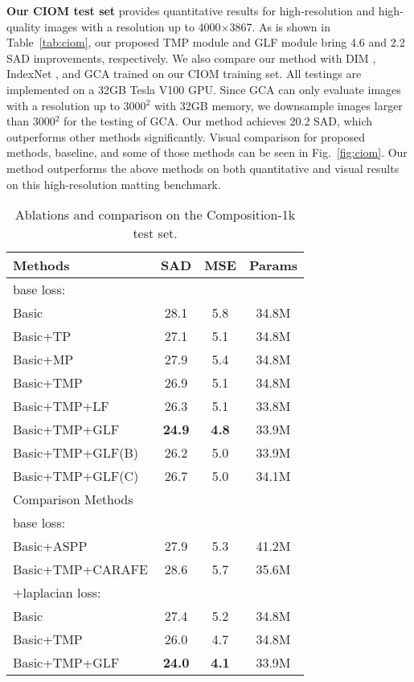 \documentclass[10pt,twocolumn,letterpaper]{article}
\begin{document}
\textbf{Our CIOM test set} provides quantitative results for high-resolution and high-quality images with a resolution up to 4000$\times$3867. As is shown in Table~\ref{tab:ciom}, our proposed TMP module and GLF module bring 4.6 and 2.2 SAD improvements, respectively. We also compare our method with DIM \cite{deepmatting}, IndexNet \cite{indexnet}, and  GCA \cite{gca} trained on our CIOM training set. All testings are implemented on a 32GB Tesla V100 GPU. Since GCA \cite{gca} can only evaluate images with a resolution up to 3000$^2$ with 32GB memory, we downsample images larger than 3000$^2$ for the testing of GCA. Our method achieves 20.2 SAD, which outperforms other methods significantly.  Visual comparison for proposed methods, baseline, and some of those methods can be seen in Fig.~\ref{fig:ciom}. Our method outperforms the above methods on both quantitative and visual results on this high-resolution matting benchmark.
\begin{table}[t]
    \begin{center}
    \caption{Ablations and comparison on the Composition-1k test set.}
    \begin{tabular}{lccc}
        \hline
        Methods & SAD & MSE   & Params \\
        \hline
        base loss:\\
        Basic & 28.1 & 5.8 & 34.8M \\
Basic+TP &27.1 & 5.1 & 34.8M \\ 
        Basic+MP&27.9 & 5.4 & 34.8M\\
        Basic+TMP&26.9 & 5.1 & 34.8M\\
        Basic+TMP+LF&26.3&5.1&33.8M\\
        Basic+TMP+GLF&\textbf{24.9} & \textbf{4.8} & 33.9M\\
        Basic+TMP+GLF(B)&26.2 & 5.0 & 33.9M\\
        Basic+TMP+GLF(C)&26.7 & 5.0 & 34.1M\\
        \hline
        Comparison Methods\\
        base loss:\\
        Basic+ASPP\cite{v3}&27.9 & 5.3 & 41.2M\\
        Basic+TMP+CARAFE\cite{carafe}&28.6 & 5.7 & 35.6M\\
        \hline
        +laplacian loss:\\
        Basic & 27.4 & 5.2 & 34.8M \\
        Basic+TMP&26.0 & 4.7 & 34.8M\\
        Basic+TMP+GLF&\textbf{24.0} & \textbf{4.1} & 33.9M\\
        \hline
    \end{tabular}
    \label{tab:albation}
    \end{center}
\end{table}
\end{document}
